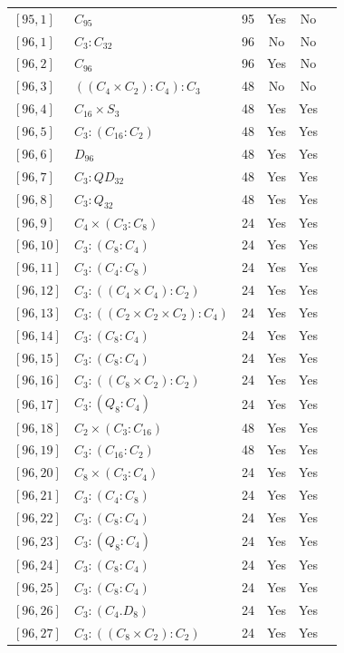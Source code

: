 \documentclass[12pt, a4paper]{article}
\theoremstyle{plain}
\theoremstyle{definition}
\begin{document}
\begin{longtable}{llcccl}
  $[95,1]$ & $C_{95}$ & 95 & Yes & No \\
  $[96,1]$ & $C_3 : C_{32}$ & 96 & No & No \\
  $[96,2]$ & $C_{96}$ & 96 & Yes & No \\
  $[96,3]$ & $((C_4 \times C_2) : C_4) : C_3$ & 48 & No & No \\
  $[96,4]$ & $C_{16} \times S_3$ & 48 & Yes & Yes \\
  $[96,5]$ & $C_3 : (C_{16} : C_2)$ & 48 & Yes & Yes \\
  $[96,6]$ & $D_{96}$ & 48 & Yes & Yes \\
  $[96,7]$ & $C_3 : QD_{32}$ & 48 & Yes & Yes \\
  $[96,8]$ & $C_3 : Q_{32}$ & 48 & Yes & Yes \\
  $[96,9]$ & $C_4 \times (C_3 : C_8)$ & 24 & Yes & Yes \\
  $[96,10]$ & $C_3 : (C_8 : C_4)$ & 24 & Yes & Yes \\
  $[96,11]$ & $C_3 : (C_4 : C_8)$ & 24 & Yes & Yes \\
  $[96,12]$ & $C_3 : ((C_4 \times C_4) : C_2)$ & 24 & Yes & Yes \\
  $[96,13]$ & $C_3 : ((C_2 \times C_2 \times C_2) : C_4)$ & 24 & Yes & Yes \\
  $[96,14]$ & $C_3 : (C_8 : C_4)$ & 24 & Yes & Yes \\
  $[96,15]$ & $C_3 : (C_8 : C_4)$ & 24 & Yes & Yes \\
  $[96,16]$ & $C_3 : ((C_8 \times C_2) : C_2)$ & 24 & Yes & Yes \\
  $[96,17]$ & $C_3 : (Q_8 : C_4)$ & 24 & Yes & Yes \\
  $[96,18]$ & $C_2 \times (C_3 : C_{16})$ & 48 & Yes & Yes \\
  $[96,19]$ & $C_3 : (C_{16} : C_2)$ & 48 & Yes & Yes \\
  $[96,20]$ & $C_8 \times (C_3 : C_4)$ & 24 & Yes & Yes \\
  $[96,21]$ & $C_3 : (C_4 : C_8)$ & 24 & Yes & Yes \\
  $[96,22]$ & $C_3 : (C_8 : C_4)$ & 24 & Yes & Yes \\
  $[96,23]$ & $C_3 : (Q_8 : C_4)$ & 24 & Yes & Yes \\
  $[96,24]$ & $C_3 : (C_8 : C_4)$ & 24 & Yes & Yes \\
  $[96,25]$ & $C_3 : (C_8 : C_4)$ & 24 & Yes & Yes \\
  $[96,26]$ & $C_3 : (C_4 . D_8)$ & 24 & Yes & Yes \\
  $[96,27]$ & $C_3 : ((C_8 \times C_2) : C_2)$ & 24 & Yes & Yes \\

\end{longtable}
\end{document}
